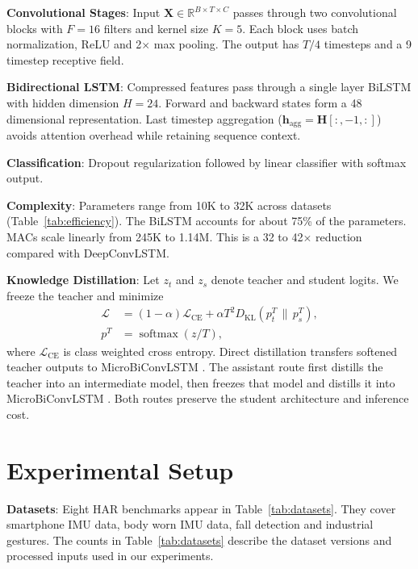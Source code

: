 \documentclass[conference,twocolumn]{IEEEtran}
\newcommand{\modelname}{MicroBiConvLSTM}
\begin{document}
\textbf{Convolutional Stages}: Input $\mathbf{X} \in \mathbb{R}^{B \times T \times C}$ passes through two convolutional blocks with $F=16$ filters and kernel size $K=5$. Each block uses batch normalization, ReLU and 2$\times$ max pooling. The output has $T/4$ timesteps and a 9 timestep receptive field.

\textbf{Bidirectional LSTM}: Compressed features pass through a single layer BiLSTM with hidden dimension $H=24$. Forward and backward states form a 48 dimensional representation. Last timestep aggregation ($\mathbf{h}_{\text{agg}} = \mathbf{H}[:, -1, :]$) avoids attention overhead while retaining sequence context.

\textbf{Classification}: Dropout regularization followed by linear classifier with softmax output.

\textbf{Complexity}: Parameters range from 10K to 32K across datasets (Table~\ref{tab:efficiency}). The BiLSTM accounts for about 75\% of the parameters. MACs scale linearly from 245K to 1.14M. This is a 32 to 42$\times$ reduction compared with DeepConvLSTM.

\textbf{Knowledge Distillation}: Let $z_t$ and $z_s$ denote teacher and student logits. We freeze the teacher and minimize
\begin{equation}
\begin{aligned}
\mathcal{L} &= (1-\alpha)\mathcal{L}_{\mathrm{CE}}+\alpha T^2D_{\mathrm{KL}}\!\left(p_t^T\,\|\,p_s^T\right),\\
p^T &= \operatorname{softmax}(z/T),
\end{aligned}
\end{equation}
where $\mathcal{L}_{\mathrm{CE}}$ is class weighted cross entropy. Direct distillation transfers softened teacher outputs to \modelname{} \cite{hinton2015distilling}. The assistant route first distills the teacher into an intermediate model, then freezes that model and distills it into \modelname{} \cite{mirzadeh2020improved}. Both routes preserve the student architecture and inference cost.

\section{Experimental Setup}\vspace{-1mm}

\textbf{Datasets}: Eight HAR benchmarks appear in Table~\ref{tab:datasets}. They cover smartphone IMU data, body worn IMU data, fall detection and industrial gestures. The counts in Table~\ref{tab:datasets} describe the dataset versions and processed inputs used in our experiments.
\end{document}
